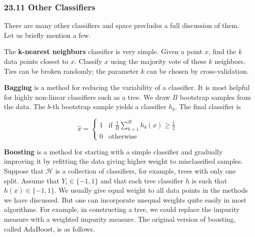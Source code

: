 \subsubsection{23.11 Other Classifiers}\label{other-classifiers}

There are many other classifiers and space precludes a full discussion
of them. Let us briefly mention a few.

The \textbf{k-nearest neighbors} classifier is very simple. Given a
point \(x\), find the \(k\) data points closest to \(x\). Classify \(x\)
using the majority vote of these \(k\) neighbors. Ties can be broken
randomly; the parameter \(k\) can be chosen by cross-validation.

\textbf{Bagging} is a method for reducing the variability of a
classifier. It is most helpful for highly non-linear classifiers such as
a tree. We draw \(B\) bootstrap samples from the data. The \(b\)-th
bootstrap sample yields a classifier \(h_b\). The final classifier is

\[ 
\hat{x} = \begin{cases}
1 & \text{if } \frac{1}{B} \sum_{b=1}^B h_b(x) \geq \frac{1}{2} \\
0 & \text{otherwise}
\end{cases}
\]

\textbf{Boosting} is a method for starting with a simple classifier and
gradually improving it by refitting the data giving higher weight to
misclassified samples. Suppose that \(\mathcal{H}\) is a collection of
classifiers, for example, trees with only one split. Assume that
\(Y_i \in \{ -1, 1 \}\) and that each tree classifier \(h\) is such that
\(h(x) \in \{ -1, 1 \}\). We usually give equal weight to all data
points in the methods we have discussed. But one can incorporate unequal
weights quite easily in most algorithms. For example, in constructing a
tree, we could replace the impurity measure with a weighted impurity
measure. The original version of boosting, called AdaBoost, is as
follows.

